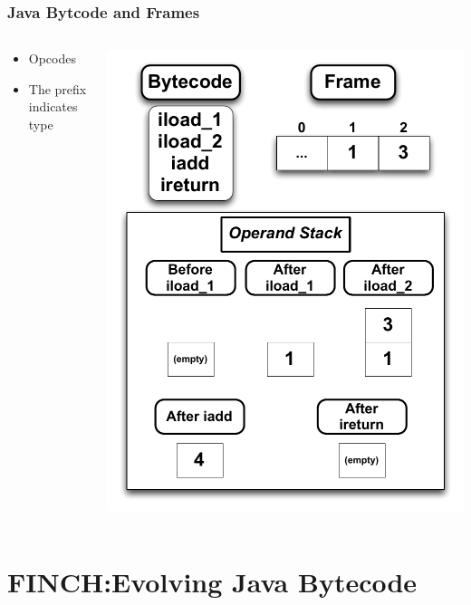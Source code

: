 \documentclass{beamer}
\begin{document}
\begin{frame}
\frametitle{Java Bytcode and Frames}
\begin{columns}
\begin{column}{0.5\textwidth}
\begin{itemize}	
\item Opcodes
\item The prefix indicates type
\end{itemize}
\end{column}

\begin{column}{0.5\textwidth}
\includegraphics[height=.8\textheight]{Illustrations/stackBytecode.pdf}
\end{column}
\end{columns}
\end{frame}


\section[FINCH]{FINCH:Evolving Java Bytecode}
\end{document}
